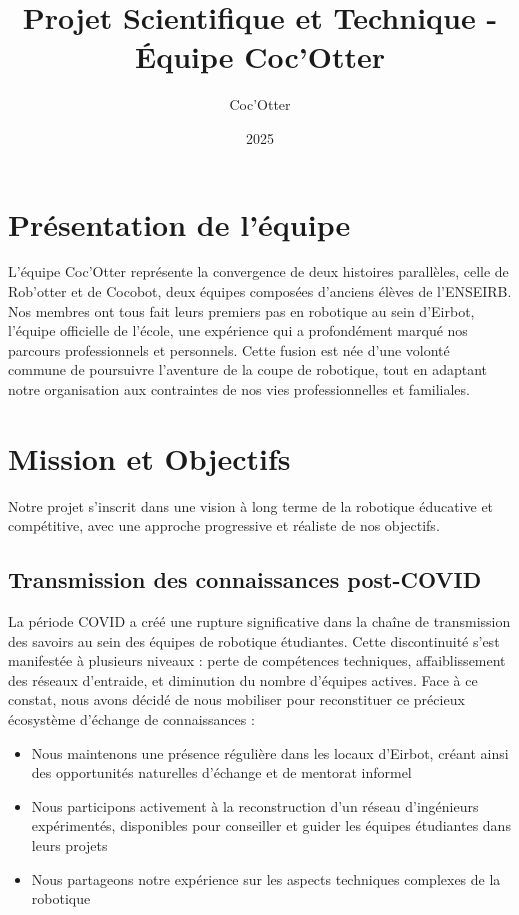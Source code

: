 \documentclass{article}
\begin{document}
\title{Projet Scientifique et Technique - Équipe Coc'Otter}
\author{Coc'Otter}
\date{2025}

\maketitle

\section{Présentation de l'équipe}

L'équipe Coc'Otter représente la convergence de deux histoires parallèles, celle de Rob'otter et de Cocobot, deux équipes composées d'anciens élèves de l'ENSEIRB. Nos membres ont tous fait leurs premiers pas en robotique au sein d'Eirbot, l'équipe officielle de l'école, une expérience qui a profondément marqué nos parcours professionnels et personnels. Cette fusion est née d'une volonté commune de poursuivre l'aventure de la coupe de robotique, tout en adaptant notre organisation aux contraintes de nos vies professionnelles et familiales.

\section{Mission et Objectifs}

Notre projet s'inscrit dans une vision à long terme de la robotique éducative et compétitive, avec une approche progressive et réaliste de nos objectifs.

\subsection{Transmission des connaissances post-COVID}
La période COVID a créé une rupture significative dans la chaîne de transmission des savoirs au sein des équipes de robotique étudiantes. Cette discontinuité s'est manifestée à plusieurs niveaux : perte de compétences techniques, affaiblissement des réseaux d'entraide, et diminution du nombre d'équipes actives. Face à ce constat, nous avons décidé de nous mobiliser pour reconstituer ce précieux écosystème d'échange de connaissances :

\begin{itemize}
    \item Nous maintenons une présence régulière dans les locaux d'Eirbot, créant ainsi des opportunités naturelles d'échange et de mentorat informel
    \item Nous participons activement à la reconstruction d'un réseau d'ingénieurs expérimentés, disponibles pour conseiller et guider les équipes étudiantes dans leurs projets
    \item Nous partageons notre expérience sur les aspects techniques complexes de la robotique
\end{itemize}
\end{document}
